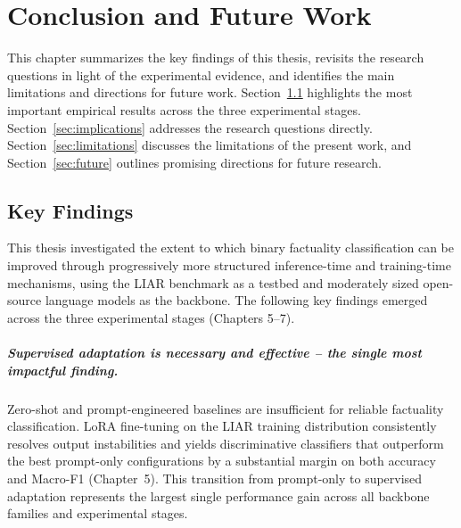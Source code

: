 \chapter{Conclusion and Future Work}

This chapter summarizes the key findings of this thesis, revisits the research questions in light of the experimental evidence, and 
identifies the main limitations and directions for future work. Section~\ref{sec:key_findings} highlights the most important 
empirical results across the three experimental stages. Section~\ref{sec:implications} addresses the research questions directly. Section~\ref{sec:limitations} discusses the limitations of the present work, and Section~\ref{sec:future} outlines promising directions for future research.

\section{Key Findings}
\label{sec:key_findings}
This thesis investigated the extent to which binary factuality classification can be improved through progressively more structured inference-time and training-time mechanisms, using the LIAR benchmark as a testbed and moderately sized open-source
language models as the backbone. The following key findings emerged across the three experimental stages (Chapters 5--7).

\paragraph{Supervised adaptation is necessary and effective -- the single most impactful finding.}
Zero-shot and prompt-engineered baselines are insufficient for reliable factuality classification. LoRA fine-tuning on the LIAR training distribution consistently resolves output instabilities and yields discriminative classifiers that outperform the best prompt-only configurations by a substantial margin on both accuracy and Macro-F1 (Chapter~5). This transition from prompt-only to 
supervised adaptation represents the largest single performance gain across all backbone families and experimental stages.


